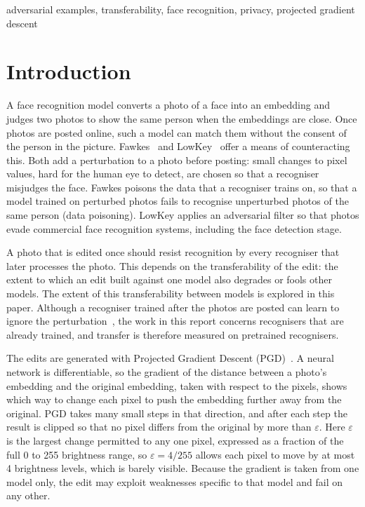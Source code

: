 \documentclass[conference]{IEEEtran}
\begin{document}
\begin{IEEEkeywords}
adversarial examples, transferability, face recognition, privacy, projected gradient descent
\end{IEEEkeywords}

\section{Introduction}
A face recognition model converts a photo of a face into an embedding and judges two photos to show the same person when the embeddings are close. Once photos are posted online, such a 
model can match them without the consent of the person in the picture. Fawkes~\cite{fawkes} and LowKey~\cite{lowkey} offer a means of counteracting this. Both add a 
perturbation to a photo before posting: small changes to pixel values, hard for the human eye to detect, are chosen so that a recogniser misjudges the face. Fawkes poisons the data that a recogniser
trains on, so that a model trained on perturbed photos fails to recognise unperturbed photos of the same person (data poisoning). LowKey applies an adversarial filter so that photos evade commercial face 
recognition systems, including the face detection stage.

A photo that is edited once should resist recognition by every recogniser that later processes the photo. This depends on the transferability of the edit: the extent to which an edit built against one model 
also degrades or fools other models. The extent of this transferability between models is explored in this paper. Although a recogniser trained after the photos are posted can learn to ignore the
perturbation~\cite{radiya}, the work in this report concerns recognisers that are already trained, and transfer is therefore measured on pretrained recognisers.

The edits are generated with Projected Gradient Descent (PGD)~\cite{madry}. A neural network is differentiable, so the gradient of the distance between a 
photo's embedding and the original embedding, taken with respect to the pixels, shows which way to change each pixel to push the embedding further away from the original. PGD takes many small steps in that direction, and after 
each step the result is clipped so that no pixel differs from the original by more than $\varepsilon$. Here $\varepsilon$ is the largest change permitted to any one pixel, expressed as a fraction of the 
full 0 to 255 brightness range, so $\varepsilon = 4/255$ allows each pixel to move by at most 4 brightness levels, which is barely visible. Because the gradient is taken from one model
only, the edit may exploit weaknesses specific to that model and fail on any other.
\end{document}
